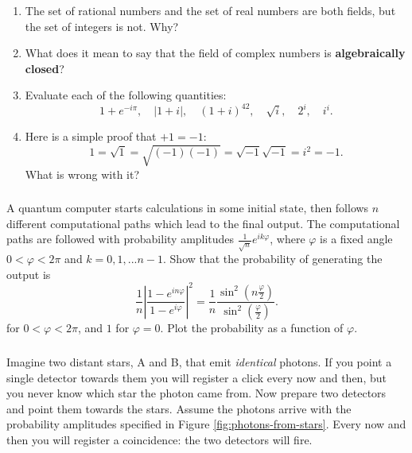 \documentclass{article}
\renewcommand{\footnote}[1]{\en{#1}}
\providecommand{\tightlist}{%
  \setlength{\itemsep}{0pt}\setlength{\parskip}{0pt}}
\begin{document}
\begin{enumerate}
\def\labelenumi{\alph{enumi}.}
\tightlist
\item
  The set of rational numbers and the set of real numbers are both fields, but the set of integers is not. Why?
\item
  What does it mean to say that the field of complex numbers is \textbf{algebraically closed}?
\item
  Evaluate each of the following quantities:
  \[
   1+e^{-i\pi},
   \quad
   |1+i|,
   \quad
   (1+i)^{42},
   \quad
   \sqrt{i},
   \quad
   2^i,
   \quad
   i^i.
    \]
\item
  Here is a simple proof that \(+1=-1\): \[1=\sqrt{1}=\sqrt{(-1)(-1)}=\sqrt{-1}\sqrt{-1}=i^2=-1.\] What is wrong with it?
\end{enumerate}

\hypertarget{section-2}{%
\subsubsection{}\label{section-2}}

A quantum computer starts calculations in some initial state, then follows \(n\) different computational paths which lead to the final output.
The computational paths are followed with probability amplitudes \(\frac{1}{\sqrt n}e^{i k \varphi}\), where \(\varphi\) is a fixed angle \(0< \varphi <2\pi\) and \(k=0,1,...n-1\).
Show that the probability of generating the output is\footnote{\(1+z+z^2+\ldots + z^n= \frac{1-z^{n+1}}{1-z}\)}
\[
  \frac{1}{n}\left\vert
    \frac{1-e^{i n\varphi}}{1-e^{i\varphi}}
  \right\vert^2
  = \frac{1}{n} \frac{\sin^2 (n\frac{\varphi}{2})}{\sin^2 (\frac{\varphi}{2})}.
\]
for \(0<\varphi<2\pi\), and \(1\) for \(\varphi=0\).
Plot the probability as a function of \(\varphi\).

\hypertarget{section-3}{%
\subsubsection{}\label{section-3}}

Imagine two distant stars, A and B, that emit \emph{identical} photons.
If you point a single detector towards them you will register a click every now and then, but you never know which star the photon came from.
Now prepare two detectors and point them towards the stars.
Assume the photons arrive with the probability amplitudes specified in Figure \ref{fig:photons-from-stars}.
Every now and then you will register a coincidence: the two detectors will fire.
\end{document}
